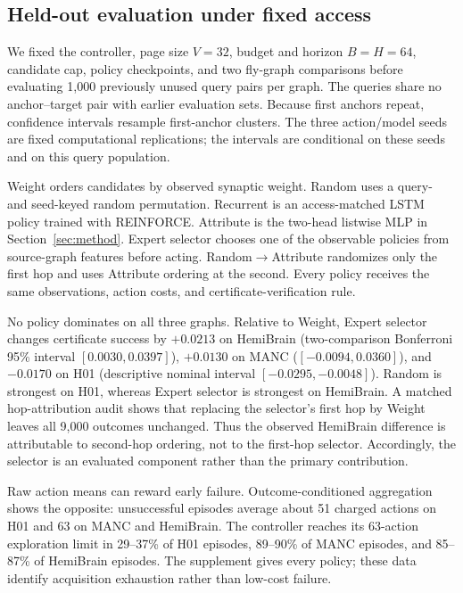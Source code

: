 \documentclass{article}
\begin{document}
\subsection{Held-out evaluation under fixed access}

We fixed the controller, page size $V=32$, budget and horizon $B=H=64$,
candidate cap, policy checkpoints, and two fly-graph comparisons before
evaluating 1,000 previously unused query pairs per graph.  The queries share no
anchor--target pair with earlier evaluation sets.  Because first anchors repeat,
confidence intervals resample first-anchor clusters.  The three action/model
seeds are fixed computational replications; the intervals are conditional on
these seeds and on this query population.

Weight orders candidates by observed synaptic weight. Random uses a
query- and seed-keyed random permutation. Recurrent is an access-matched LSTM policy trained with REINFORCE. Attribute is the two-head
listwise MLP in Section~\ref{sec:method}. Expert selector chooses one
of the observable policies from source-graph features before acting.
Random$\rightarrow$Attribute randomizes only the first hop and uses Attribute
ordering at the second. Every policy receives the same observations, action
costs, and certificate-verification rule.


No policy dominates on all three graphs.  Relative to Weight, Expert selector
changes certificate success by $+0.0213$ on HemiBrain (two-comparison
Bonferroni 95\% interval $[0.0030,0.0397]$), $+0.0130$ on MANC
($[-0.0094,0.0360]$), and $-0.0170$ on H01 (descriptive nominal interval
$[-0.0295,-0.0048]$). Random is strongest on H01, whereas Expert selector is
strongest on HemiBrain. A matched hop-attribution audit shows that replacing
the selector's first hop by Weight leaves all 9,000 outcomes unchanged. Thus the
observed HemiBrain difference is attributable to second-hop ordering, not to the
first-hop selector. Accordingly, the selector is an evaluated component rather than the primary
contribution.

Raw action means can reward early failure.  Outcome-conditioned aggregation
shows the opposite: unsuccessful episodes average about 51 charged actions on
H01 and 63 on MANC and HemiBrain. The controller reaches its 63-action
exploration limit in 29--37\% of H01 episodes, 89--90\% of MANC episodes, and
85--87\% of HemiBrain episodes. The supplement gives every policy;
these data identify acquisition exhaustion rather than low-cost failure.
\end{document}
